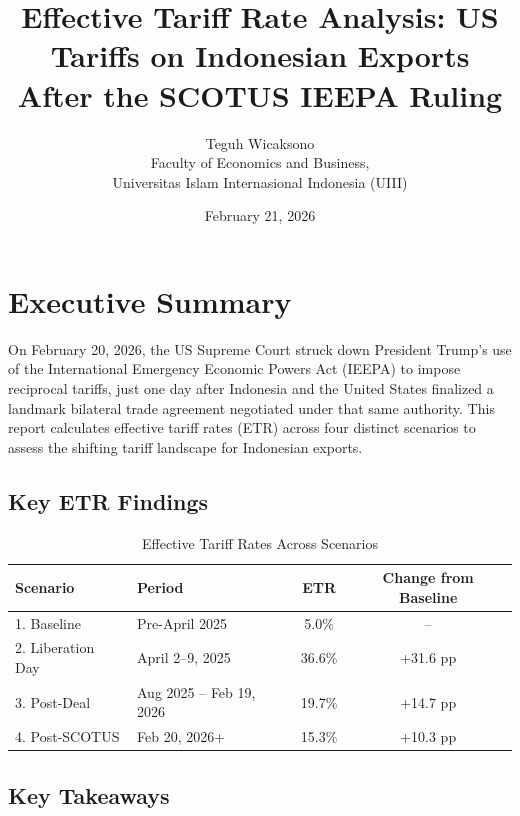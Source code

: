 \documentclass[12pt,a4paper]{article}
\title{\textbf{Effective Tariff Rate Analysis: US Tariffs on Indonesian Exports After the SCOTUS IEEPA Ruling}}
\author{Teguh Wicaksono\\
Faculty of Economics and Business,\\
Universitas Islam Internasional Indonesia (UIII)}
\date{February 21, 2026}
\begin{document}
\maketitle

\tableofcontents
\newpage

\section{Executive Summary}

On February 20, 2026, the US Supreme Court struck down President Trump's use of the International Emergency Economic Powers Act (IEEPA) to impose reciprocal tariffs, just one day after Indonesia and the United States finalized a landmark bilateral trade agreement negotiated under that same authority. This report calculates effective tariff rates (ETR) across four distinct scenarios to assess the shifting tariff landscape for Indonesian exports.

\subsection{Key ETR Findings}

\begin{table}[htbp]
\centering
\caption{Effective Tariff Rates Across Scenarios}
\begin{tabular}{llcc}
\toprule
\textbf{Scenario} & \textbf{Period} & \textbf{ETR} & \textbf{Change from Baseline} \\
\midrule
1. Baseline & Pre-April 2025 & 5.0\% & -- \\
2. Liberation Day & April 2--9, 2025 & 36.6\% & +31.6 pp \\
3. Post-Deal & Aug 2025 -- Feb 19, 2026 & 19.7\% & +14.7 pp \\
4. Post-SCOTUS & Feb 20, 2026+ & 15.3\% & +10.3 pp \\
\bottomrule
\end{tabular}
\end{table}

\subsection{Key Takeaways}
\end{document}
